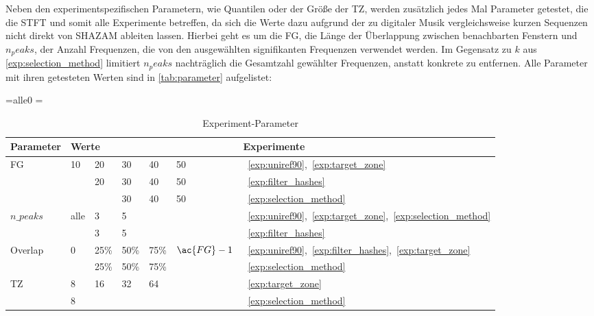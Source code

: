         Neben den experimentspezifischen Parametern, wie Quantilen oder der Größe der \acl{TZ}, werden zusätzlich jedes Mal Parameter getestet, die die \ac{STFT} und somit alle Experimente betreffen, da sich die Werte dazu aufgrund der zu digitaler Musik vergleichsweise kurzen Sequenzen nicht direkt von SHAZAM ableiten lassen. Hierbei geht es um die \ac{FG}, die Länge der Überlappung zwischen benachbarten Fenstern und $n_peaks$, der Anzahl Frequenzen, die von den ausgewählten signifikanten Frequenzen verwendet werden. Im Gegensatz zu $k$ aus \autoref{exp:selection_method} limitiert $n_peaks$ nachträglich die Gesamtzahl gewählter Frequenzen, anstatt konkrete zu entfernen. Alle Parameter mit ihren getesteten Werten sind in \autoref{tab:parameter} aufgelistet:
        
        \begin{table}[H]
            \centering
            \caption{Experiment-Parameter}
            \label{tab:parameter}
            \newdimen\mywidth
            =\hbox{alle0}
            \mywidth=
            \begin{tabular}{lllllll}
            \toprule
             \textbf{Parameter} & \multicolumn{5}{l}{\textbf{Werte}} & \textbf{Experimente}\\
             \midrule
             \acf{FG}    & 10 & 20    & 30     & 40     & 50        &~\ref{exp:uniref90},~\ref{exp:target_zone}\\
                         &    & 20    & 30     & 40     & 50        &~\ref{exp:filter_hashes}\\
                         &    &       & 30     & 40     & 50        &~\ref{exp:selection_method}\\
             $n\_peaks$  &alle& 3     & 5      &        &           &~\ref{exp:uniref90},~\ref{exp:target_zone},~\ref{exp:selection_method}\\
                         &    & 3     & 5      &        &           &~\ref{exp:filter_hashes}\\
             Overlap     & 0  & 25\%  & 50\%   & 75\%   &$\ac{FG}-1$&~\ref{exp:uniref90},~\ref{exp:filter_hashes},~\ref{exp:target_zone}\\
                         &    & 25\%  & 50\%   & 75\%   &           &~\ref{exp:selection_method}\\
             \acl{TZ}    & 8  & 16    & 32     & 64     &           &~\ref{exp:target_zone}\\
                         & 8  &       &        &        &           &~\ref{exp:selection_method}\\

\end{tabular}
\end{table}
